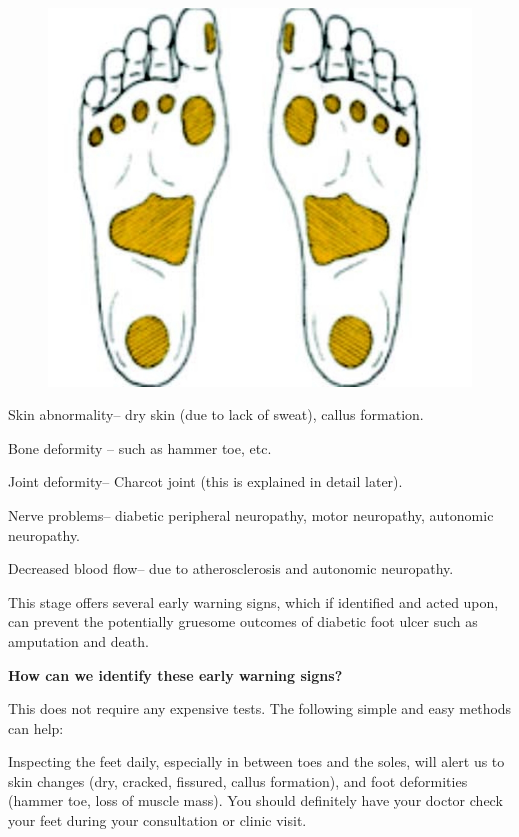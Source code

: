 {\begin{figure}
\includegraphics{images/062.jpg}
\end{figure}

\item Skin abnormality– dry skin (due to lack of sweat), callus formation.

 \item Bone deformity – such as hammer toe, etc.

 \item Joint deformity– Charcot joint (this is explained in detail later).

 \item Nerve problems– diabetic peripheral neuropathy, motor neuropathy, autonomic neuropathy.

 \item Decreased blood flow– due to atherosclerosis and autonomic neuropathy.

This stage offers several early warning signs, which if identified and acted upon, can prevent the potentially gruesome outcomes of diabetic foot ulcer such as amputation and death.

\textbf{How can we identify these early warning signs?}

This does not require any expensive tests. The following simple and easy methods can help:

\item Inspecting the feet daily, especially in between toes and the soles, will alert us to skin changes (dry, cracked, fissured, callus formation), and foot deformities (hammer toe, loss of muscle mass). You should definitely have your doctor check your feet during your consultation or clinic visit.

}

